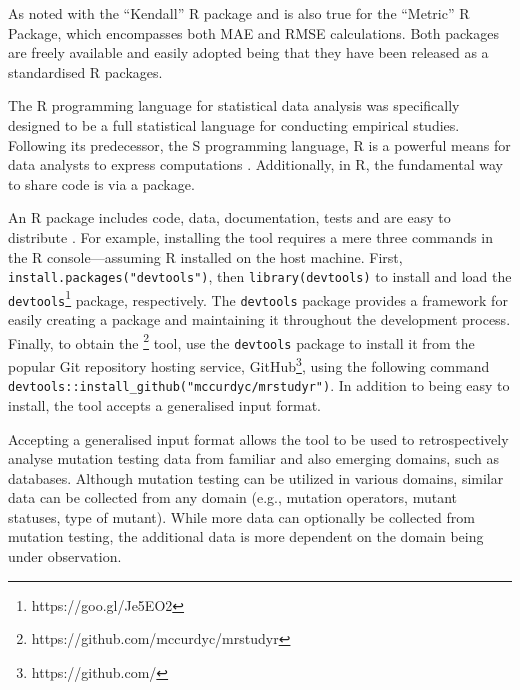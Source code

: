 As noted with the ``Kendall'' R package and is also true for the ``Metric'' R Package, which
encompasses both MAE and RMSE calculations. Both packages are freely available and easily adopted being
that they have been released as a standardised R packages.

The R programming language for statistical data analysis was specifically designed to
be a full statistical language for conducting empirical studies. Following its predecessor, the S programming
language, R is a powerful means for data analysts to express computations \cite{ihaka1996r}.
Additionally, in R, the fundamental way to share code is via a package.

An R package includes code, data, documentation, tests and are easy to distribute \cite{wickham2015r}.
For example, installing the \mr tool requires a mere three commands in the R console---assuming R installed on the host machine.
First, \texttt{install.packages("devtools")}, then \texttt{library(devtools)} to install and load the \texttt{devtools}\footnote{https://goo.gl/Je5EO2} package, respectively.
The \texttt{devtools} package provides a framework for easily creating a package and maintaining it throughout the development process.
Finally, to obtain the \mr\footnote{https://github.com/mccurdyc/mrstudyr} tool, use the \texttt{devtools} package to install it
from the popular Git repository hosting service, GitHub\footnote{https://github.com/}, using the following command \texttt{devtools::install\_github("mccurdyc/mrstudyr")}.
In addition to being easy to install, the \mr tool accepts a generalised input format.

Accepting a generalised input format allows the \mr tool to be used to retrospectively analyse mutation testing
data from familiar and also emerging domains, such as databases. Although mutation
testing can be utilized in various domains, similar data can be collected from any
domain (e.g., mutation operators, mutant statuses, type of mutant). While more data
can optionally be collected from mutation testing, the additional data is more
dependent on the domain being under observation.
